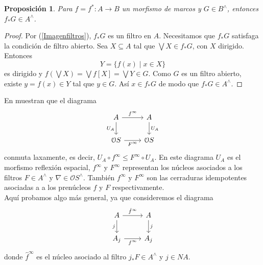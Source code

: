 \documentclass[11pt]{amsart}
\theoremstyle{plain}
\newtheorem{prop}[thm]{Proposición}
\theoremstyle{definition}
\begin{document}
\begin{prop}\label{fF}
Para $f=f^*\colon A\to B$ un morfismo de marcos y $G\in B^\wedge$, entonces $f_*G\in A^\wedge$.
\end{prop}

\begin{proof}
Por (\ref{Imagenfiltros}), $f_*G$ es un filtro en $A$. Necesitamos que $f_*G$ satisfaga la condición de filtro abierto. Sea $X\subseteq A$ tal que $\bigvee X\in f_*G$, con $X$ dirigido. Entonces
\[
Y=\{f(x)\mid x\in X\}
\] 
es dirigido y $f(\bigvee X)=\bigvee f[X]=\bigvee Y\in G$. Como $G$ es un filtro abierto, existe $y=f(x)\in Y$ tal que $y\in G$. Así $x\in f_*G$ de modo que $f_*G\in A^\wedge$.
\end{proof}

En \cite[Lema 8.9 y Corolario 8.10]{simmons2004vietoris} muestran que el diagrama
\[\begin{tikzcd}
	A & A \\
	{\mathcal{O}S} & {\mathcal{O}S}
	\arrow["{f^\infty}", from=1-1, to=1-2]
	\arrow["{U_A}"', from=1-1, to=2-1]
	\arrow["{U_A}", from=1-2, to=2-2]
	\arrow["{F^\infty}"', from=2-1, to=2-2]
\end{tikzcd}\]
conmuta laxamente, es decir, $U_A\circ f^\infty\leq F^\infty \circ U_A$. En este diagrama $U_A$ es el morfismo reflexión espacial, $f^\infty$ y $F^\infty$ representan los núcleos asociados a los filtros $F\in A^\wedge$ y $\nabla\in \mathcal{O}S^\wedge$. También $f^\infty$ y $F^\infty$ son las cerraduras idempotentes asociadas a 
a los prenúcleos $f$ y $F$ respectivamente.\\

Aquí probamos algo más general, ya que consideremos el diagrama
\[\begin{tikzcd}
	A & A \\
	{A_j} & {A_j}
	\arrow["{\hat{f}^\infty}", from=1-1, to=1-2]
	\arrow["j"', from=1-1, to=2-1]
	\arrow["j", from=1-2, to=2-2]
	\arrow["{f^\infty}"', from=2-1, to=2-2]
\end{tikzcd}\]
donde $\hat{f}^\infty$ es el núcleo asociado al filtro $j_*F\in A^\wedge$ y $j\in NA$.  
\end{document}

